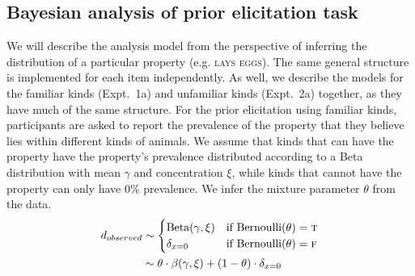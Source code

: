 \documentclass{pnastwo}
\begin{document}
\begin{article}
\begin{materials}
%

\subsection{Bayesian analysis of prior elicitation task}
We will describe the analysis model from the perspective of inferring the distribution of a particular property (e.g. \textsc{lays eggs}). 
The same general structure is implemented for each item independently. 
As well, we describe the models for the familiar kinds (Expt.~1a) and unfamiliar kinds (Expt.~2a) together, as they have much of the same structure. 
For the prior elicitation using familiar kinds, participants are asked to report the prevalence of the property that they believe lies within different kinds of animals.
We assume that kinds that can have the property have the property's prevalence distributed according to a Beta distribution with mean $\gamma$ and concentration $\xi$, while kinds that cannot have the property can only have 0\% prevalence.
We infer the mixture parameter $\theta$ from the data.
\begin{align*}
d_{observed} & \sim \begin{cases}
				 \text{Beta}(\gamma, \xi) & \mbox{if } \text{Bernoulli}(\theta) = \textsc{t}  \\
				 \delta_{x=0} & \mbox{if }\text{Bernoulli}(\theta) = \textsc{f} \\
				\end{cases} \\
	 &  \sim \theta \cdot \beta(\gamma,\xi)+ (1 - \theta) \cdot \delta_{x=0}  \\
\end{align*}


\end{materials}
\end{article}
\end{document}
